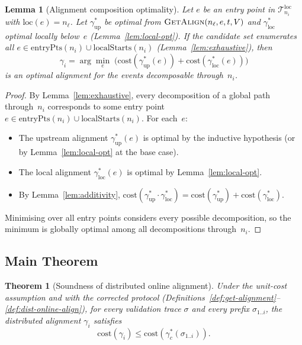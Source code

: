 \documentclass[11pt,a4paper]{article}
\newtheorem{lemma}{Lemma}
\newtheorem{theorem}{Theorem}
\newcommand{\loc}{\mathrm{loc}}
\newcommand{\T}{\mathcal{T}}
\newcommand{\Tl}{\T^{\mathrm{loc}}}
\newcommand{\cost}{\mathrm{cost}}
\newcommand{\alignment}{\gamma}
\newcommand{\trace}{\sigma}
\newcommand{\ep}{\mathrm{entryPts}}
\newcommand{\ls}{\mathrm{localStarts}}
\newcommand{\GA}{\textsc{GetAlign}}
\begin{document}
\begin{lemma}[Alignment composition optimality]\label{lem:composition}
  Let $e$ be an entry point in $\Tl_{n_i}$ with $\loc(e) = n_\ell$.
  Let $\alignment_{\mathrm{up}}^{*}$ be optimal from
  $\GA(n_\ell, e, t, V)$ and $\alignment_{\mathrm{loc}}^{*}$ optimal
  locally below~$e$ (Lemma~\ref{lem:local-opt}).
  If the candidate set enumerates all
  $e \in \ep(n_i) \cup \ls(n_i)$ (Lemma~\ref{lem:exhaustive}), then
  \[
    \alignment_i
    = \arg\min_{e}\;
      \bigl(
        \cost(\alignment_{\mathrm{up}}^{*}(e))
        + \cost(\alignment_{\mathrm{loc}}^{*}(e))
      \bigr)
  \]
  is an optimal alignment for the events decomposable through~$n_i$.
\end{lemma}

\begin{proof}
  By Lemma~\ref{lem:exhaustive}, every decomposition of a global path
  through~$n_i$ corresponds to some entry point
  $e \in \ep(n_i) \cup \ls(n_i)$.
  For each~$e$:
  \begin{itemize}
    \item The upstream alignment $\alignment_{\mathrm{up}}^{*}(e)$ is
          optimal by the inductive hypothesis (or by
          Lemma~\ref{lem:local-opt} at the base case).
    \item The local alignment $\alignment_{\mathrm{loc}}^{*}(e)$ is
          optimal by Lemma~\ref{lem:local-opt}.
    \item By Lemma~\ref{lem:additivity},
          $\cost(\alignment_{\mathrm{up}}^{*} \cdot
                 \alignment_{\mathrm{loc}}^{*})
          = \cost(\alignment_{\mathrm{up}}^{*})
          + \cost(\alignment_{\mathrm{loc}}^{*})$.
  \end{itemize}
  Minimising over all entry points considers every possible
  decomposition, so the minimum is globally optimal among all
  decompositions through~$n_i$.
\end{proof}

\subsection{Main Theorem}

\begin{theorem}[Soundness of distributed online alignment]%
  \label{thm:soundness}
  Under the unit-cost assumption and with the corrected protocol
  (Definitions~\ref{def:get-alignment}--\ref{def:dist-online-align}),
  for every validation trace $\trace$ and every prefix $\trace_{1..i}$,
  the distributed alignment $\alignment_i$ satisfies
  \[
    \cost(\alignment_i) \leq \cost(\alignment^{*}_c(\trace_{1..i})).
  \]
\end{theorem}
\end{document}
